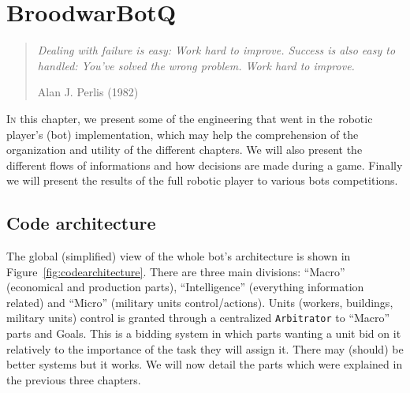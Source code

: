 \chapter{BroodwarBotQ}%
\label{chapter:bot}



\begin{quotation}
\textit{Dealing with failure is easy: Work hard to improve. Success is also easy to handled: You've solved the wrong problem. Work hard to improve.}\\
\begin{flushright}Alan J. Perlis (1982)\end{flushright}
\end{quotation}

\lettrine{I}{n} this chapter, we present some of the engineering that went in the robotic player's (bot) implementation, which may help the comprehension of the organization and utility of the different chapters. We will also present the different flows of informations and how decisions are made during a game. Finally we will present the results of the full robotic player to various bots competitions.




\section{Code architecture}

\label{sec:codearchitecture}

The global (simplified) view of the whole bot's architecture is shown in Figure~\ref{fig:codearchitecture}. There are three main divisions: ``Macro'' (economical and production parts), ``Intelligence'' (everything information related) and ``Micro'' (military units control/actions). Units (workers, buildings, military units) control is granted through a centralized \texttt{Arbitrator} to ``Macro'' parts and Goals. This is a bidding system in which parts wanting a unit bid on it relatively to the importance of the task they will assign it. There may (should) be better systems but it works. We will now detail the parts which were explained in the previous three chapters.

